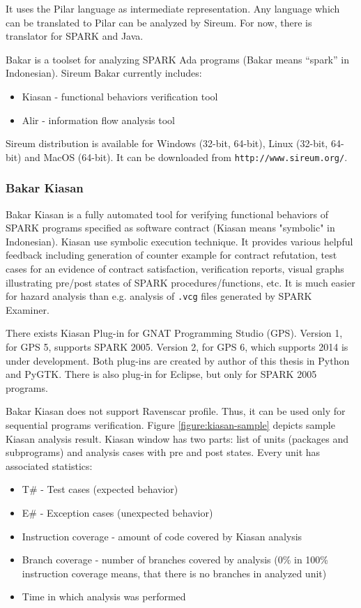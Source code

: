 It uses the Pilar language \cite{Pilar:Paper} as intermediate representation. Any language which can be translated to Pilar can be analyzed by Sireum. For now, there is translator for SPARK and Java.

Bakar is a toolset for analyzing SPARK Ada programs (Bakar means “spark” in Indonesian). Sireum Bakar currently includes:
\begin{itemize}
	\item Kiasan - functional behaviors verification tool
	\item Alir - information flow analysis tool	
\end{itemize}

Sireum distribution is available for Windows (32-bit, 64-bit), Linux (32-bit, 64-bit) and MacOS (64-bit). It can be downloaded from \lstinline{http://www.sireum.org/}.


\subsubsection{Bakar Kiasan}

Bakar Kiasan \cite{Kiasan:Paper} is a fully automated tool for verifying functional behaviors of SPARK programs specified as software contract (Kiasan means "symbolic" in Indonesian). Kiasan use symbolic execution technique. It provides various helpful feedback including generation of counter example for contract refutation, test cases for an evidence of contract satisfaction, verification reports, visual graphs illustrating pre/post states of SPARK procedures/functions, etc. It is much easier for hazard analysis than e.g. analysis of \lstinline{.vcg} files generated by SPARK Examiner.

There exists Kiasan Plug-in for GNAT Programming Studio (GPS). Version 1, for GPS 5, supports SPARK 2005. Version 2, for GPS 6, which supports 2014 is under development. Both plug-ins are created by author of this thesis in Python and PyGTK. There is also plug-in for Eclipse, but only for SPARK 2005 programs.

Bakar Kiasan does not support Ravenscar profile. Thus, it can be used only for sequential programs verification. Figure \ref{figure:kiasan-sample} depicts sample Kiasan analysis result. Kiasan window has two parts: list of units (packages and subprograms) and analysis cases with pre and post states. Every unit has associated statistics:
\begin{itemize}
	\item T\# - Test cases (expected behavior)
	\item E\# - Exception cases (unexpected behavior)
	\item Instruction coverage - amount of code covered by Kiasan analysis
	\item Branch coverage - number of branches covered by analysis (0\% in 100\% instruction coverage means, that there is no branches in analyzed unit)
	\item Time in which analysis was performed
\end{itemize}

